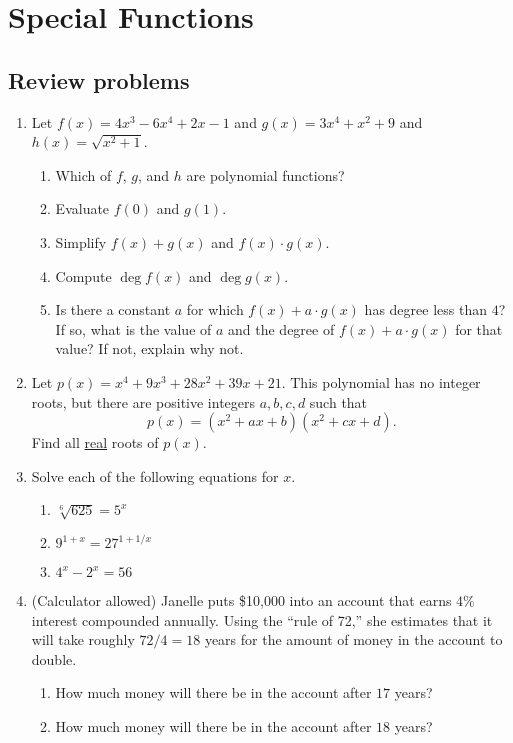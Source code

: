 \section{Special Functions}

\subsection{Review problems}

\begin{enumerate}
\item Let $f(x) = 4x^3 - 6x^4 + 2x - 1$ and $g(x) = 3x^4 + x^2 + 9$ and $h(x) = \sqrt{x^2 + 1}$.
\begin{enumerate}
\item Which of $f$, $g$, and $h$ are polynomial functions?
\item Evaluate $f(0)$ and $g(1)$.
\item Simplify $f(x) + g(x)$ and $f(x)\cdot g(x)$.
\item Compute $\deg f(x)$ and $\deg g(x)$.
\item Is there a constant $a$ for which $f(x) + a\cdot g(x)$ has degree less than $4$? If so, what is the value of $a$ and the degree of $f(x) + a\cdot g(x)$ for that value? If not, explain why not.
\end{enumerate}
\item Let $p(x) = x^4 + 9x^3 + 28x^2 + 39x + 21$. This polynomial has no integer roots, but there are positive integers $a,b,c,d$ such that 
\begin{equation*}
p(x) = (x^2 + ax + b)(x^2 + cx + d).
\end{equation*}
Find all \underline{real} roots of $p(x)$.
\item Solve each of the following equations for $x$.
\begin{enumerate}
\item $\sqrt[6]{625} = 5^x$
\item $9^{1 + x} = 27^{1 + 1/x}$
\item $4^x - 2^x = 56$
\end{enumerate}
\item (Calculator allowed) Janelle puts \$10,000 into an account that earns $4\%$ interest compounded annually. Using the ``rule of 72,'' she estimates that it will take roughly $72/4 = 18$ years for the amount of money in the account to double.
\begin{enumerate}
\item How much money will there be in the account after $17$ years?
\item How much money will there be in the account after $18$ years?

\end{enumerate}
\end{enumerate}
